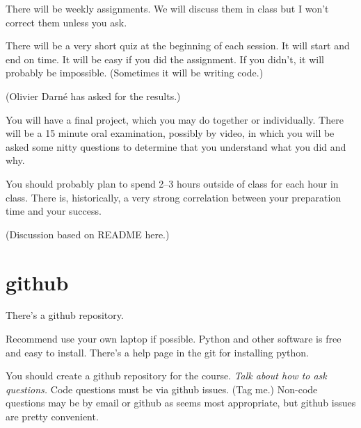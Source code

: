 There will be weekly assignments.  We will discuss them in class but I
won't correct them unless you ask.

There will be a very short quiz at the beginning of each session.  It
will start and end on time.  It will be easy if you did the
assignment.  If you didn't, it will probably be impossible.
(Sometimes it will be writing code.)

(Olivier Darné has asked for the results.)

You will have a final project, which you may do together or
individually.  There will be a 15 minute oral examination, possibly by
video, in which you will be asked some nitty questions to determine
that you understand what you did and why.

You should probably plan to spend 2--3 hours outside of class for each
hour in class.  There is, historically, a very strong correlation
between your preparation time and your success.

(Discussion based on README here.)

\section*{github}

There's a github repository.

Recommend use your own laptop if possible.  Python and other software
is free and easy to install.  There's a help page in the git for
installing python.

You should create a github repository for the course.  \textit{Talk
  about how to ask questions.}  Code questions must be via github
issues.  (Tag me.)  Non-code questions may be by email or github as
seems most appropriate, but github issues are pretty convenient.



